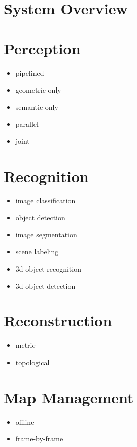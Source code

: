 \documentclass{article}
\begin{document}
	\section{System Overview}
	
	\section{Perception}
	
	\begin{itemize}
		\item pipelined
		\item geometric only
		\item semantic only
		\item parallel
		\item joint
	\end{itemize}
	
	\section{Recognition}
	
	\begin{itemize}
		\item image classification
		\item object detection
		\item image segmentation
		\item scene labeling
		\item 3d object recognition
		\item 3d object detection
	\end{itemize}
	
	\section{Reconstruction}
	
	\begin{itemize}
		\item metric
		\item topological
	\end{itemize}
	
	\section{Map Management}
	
	\begin{itemize}
		\item offline
		\item frame-by-frame
	\end{itemize}
	
\end{document}
